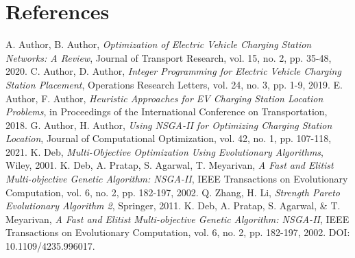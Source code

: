 \documentclass[12pt]{report}
\begin{document}
\chapter{References}
\begin{thebibliography}{99}
     A. Author, B. Author, \textit{Optimization of Electric Vehicle Charging Station Networks: A Review}, Journal of Transport Research, vol. 15, no. 2, pp. 35-48, 2020.
     C. Author, D. Author, \textit{Integer Programming for Electric Vehicle Charging Station Placement}, Operations Research Letters, vol. 24, no. 3, pp. 1-9, 2019.
     E. Author, F. Author, \textit{Heuristic Approaches for EV Charging Station Location Problems}, in Proceedings of the International Conference on Transportation, 2018.
     G. Author, H. Author, \textit{Using NSGA-II for Optimizing Charging Station Location}, Journal of Computational Optimization, vol. 42, no. 1, pp. 107-118, 2021.
     K. Deb, \textit{Multi-Objective Optimization Using Evolutionary Algorithms}, Wiley, 2001.
     K. Deb, A. Pratap, S. Agarwal, T. Meyarivan, \textit{A Fast and Elitist Multi-objective Genetic Algorithm: NSGA-II}, IEEE Transactions on Evolutionary Computation, vol. 6, no. 2, pp. 182-197, 2002.
     Q. Zhang, H. Li, \textit{Strength Pareto Evolutionary Algorithm 2}, Springer, 2011.
     K. Deb, A. Pratap, S. Agarwal, \& T. Meyarivan, \textit{A Fast and Elitist Multi-objective Genetic Algorithm: NSGA-II}, IEEE Transactions on Evolutionary Computation, vol. 6, no. 2, pp. 182-197, 2002. DOI: 10.1109/4235.996017.
\end{thebibliography}
\end{document}

